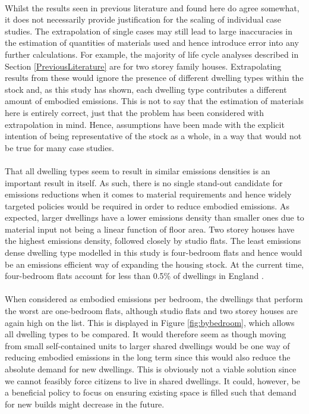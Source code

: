 \documentclass[12pt]{article}
\begin{document}
\paragraph{}
Whilst the results seen in previous literature and found here do agree somewhat, it does not necessarily provide justification for the scaling of individual case studies. The extrapolation of single cases may still lead to large inaccuracies in the estimation of quantities of materials used and hence introduce error into any further calculations. For example, the majority of life cycle analyses described in Section \ref{PreviousLiterature} are for two storey family houses. Extrapolating results from these would ignore the presence of different dwelling types within the stock and, as this study has shown, each dwelling type contributes a different amount of embodied emissions. This is not to say that the estimation of materials here is entirely correct, just that the problem has been considered with extrapolation in mind. Hence, assumptions have been made with the explicit intention of being representative of the stock as a whole, in a way that would not be true for many case studies.

\paragraph{}
That all dwelling types seem to result in similar emissions densities is an important result in itself. As such, there is no single stand-out candidate for emissions reductions when it comes to material requirements and hence widely targeted policies would be required in order to reduce embodied emissions. As expected, larger dwellings have a lower emissions density than smaller ones due to material input not being a linear function of floor area. Two storey houses have the highest emissions density, followed closely by studio flats. The least emissions dense dwelling type modelled in this study is four-bedroom flats and hence would be an emissions efficient way of expanding the housing stock. At the current time, four-bedroom flats account for less than 0.5\% of dwellings in England \citep{Ministry_of_Housing_Communities2012-ez}. 

\paragraph{}
When considered as embodied emissions per bedroom, the dwellings that perform the worst are one-bedroom flats, although studio flats and two storey houses are again high on the list. This is displayed in Figure \ref{fig:bybedroom}, which allows all dwelling types to be compared. It would therefore seem as though moving from small self-contained units to larger shared dwellings would be one way of reducing embodied emissions in the long term since this would also reduce the absolute demand for new dwellings. This is obviously not a viable solution since we cannot feasibly force citizens to live in shared dwellings. It could, however, be a beneficial policy to focus on ensuring existing space is filled such that demand for new builds might decrease in the future.
\end{document}
